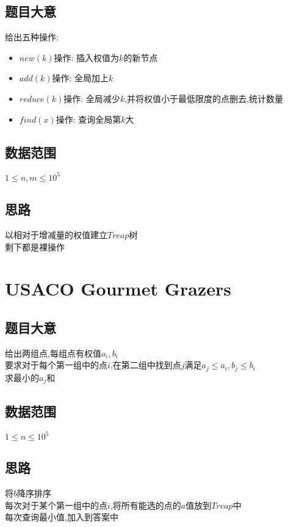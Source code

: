 \documentclass{ctexart}
\numberwithin{equation}{section}
\begin{document}
\begin{flushleft}
  \subsection{题目大意}
  给出五种操作:\\
  \begin{itemize}
  \item $new(k)$操作: 插入权值为$k$的新节点
  \item $add(k)$操作: 全局加上$k$
  \item $reduce(k)$操作: 全局减少$k$,并将权值小于最低限度的点删去,统计数量
  \item $find(x)$操作: 查询全局第$k$大
  \end{itemize}
  \subsection{数据范围}
  $1\le n,m\le 10^5$\\
  \subsection{思路}
  以相对于增减量的权值建立$Treap$树\\
  剩下都是裸操作\\
  \newpage

  \section{USACO Gourmet Grazers}
  \subsection{题目大意}
  给出两组点,每组点有权值$a_i, b_i$\\
  要求对于每个第一组中的点$i$,在第二组中找到点$j$满足$a_j\le a_i, b_j\le b_i$\\
  求最小的$a_j$和\\
  \subsection{数据范围}
  $1\le n\le 10^5$\\
  \subsection{思路}
  将$b$降序排序\\
  每次对于某个第一组中的点$i$,将所有能选的点的$a$值放到$Treap$中\\
  每次查询最小值,加入到答案中\\
  \newpage


\end{flushleft}
\end{document}
